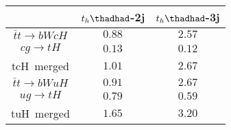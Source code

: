 
\centering
\begin{tabular}{ccc} \toprule\toprule
& $t_{h}\thadhad$-2j & $t_{h}\thadhad$-3j\\\midrule
$\bar{t}t\to bWcH$ & $0.88$ & $2.57$ \\
$cg\to tH$ &  $0.13$        & $0.12$ \\
tcH~merged &  $1.01$        & $2.67$  \\
$\bar{t}t\to bWuH$ & $0.91$ & $2.67$   \\
$ug\to tH$ & $0.79$         & $0.59$   \\
tuH~merged & $1.65$         & $3.20$   \\
\bottomrule\bottomrule
\end{tabular}